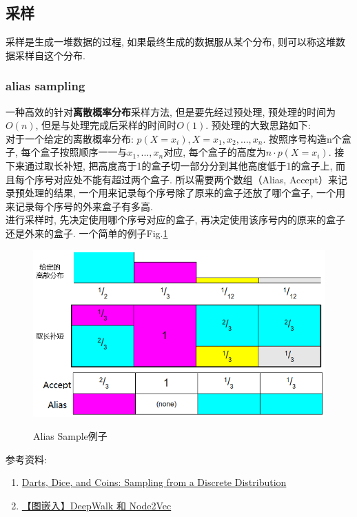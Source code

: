 \subsection{采样}
采样是生成一堆数据的过程, 如果最终生成的数据服从某个分布, 则可以称这堆数据采样自这个分布. 
\subsubsection{alias sampling }
一种高效的针对\textbf{离散概率分布}采样方法, 但是要先经过预处理, 预处理的时间为$O(n)$, 但是与处理完成后采样的时间时$O(1)$. 预处理的大致思路如下: \\
对于一个给定的离散概率分布: $p(X = x_i) , X = x_1, x_2, ..., x_n$. 按照序号构造n个盒子, 每个盒子按照顺序一一与$x_1, ..., x_n$对应, 每个盒子的高度为$n \cdot p(X = x_i)$. 接下来通过取长补短, 把高度高于1的盒子切一部分分到其他高度低于1的盒子上, 而且每个序号对应处不能有超过两个盒子. 所以需要两个数组（Alias, Accept）来记录预处理的结果, 一个用来记录每个序号除了原来的盒子还放了哪个盒子, 一个用来记录每个序号的外来盒子有多高. \\
进行采样时, 先决定使用哪个序号对应的盒子, 再决定使用该序号内的原来的盒子还是外来的盒子. 一个简单的例子Fig.\ref{fig:alias-sample}
\begin{figure}[h]
	\centering
	\includegraphics[width=.8\textwidth]{pics/alias-sample.png}
	\label{fig:alias-sample}
	\caption{Alias Sample例子}
\end{figure}


参考资料: 
\begin{enumerate}
    \item \href{https://www.keithschwarz.com/darts-dice-coins/}{Darts, Dice, and Coins: Sampling from a Discrete Distribution}
    \item \href{https://www.cnblogs.com/dogecheng/p/13198198.html}{【图嵌入】DeepWalk 和 Node2Vec}
\end{enumerate}

